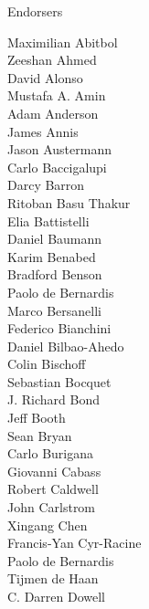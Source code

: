 \documentclass[PICOAPC.tex]{subfiles}
\begin{document}
\vskip -7pt

\large { \centerline {Endorsers}}
%
\footnotesize {
\begin{multicols}{4}
Maximilian Abitbol              \\
Zeeshan Ahmed                   \\
David Alonso                    \\
Mustafa A. Amin                 \\
Adam Anderson                   \\
James Annis                     \\
Jason Austermann                \\
Carlo Baccigalupi               \\
Darcy Barron                    \\
Ritoban Basu Thakur             \\
Elia Battistelli                \\
Daniel Baumann                  \\
Karim Benabed                   \\
Bradford Benson                 \\
Paolo de Bernardis              \\
Marco Bersanelli                \\
Federico Bianchini              \\
Daniel Bilbao-Ahedo             \\
Colin Bischoff                  \\
Sebastian Bocquet               \\
J. Richard Bond                 \\
Jeff Booth                      \\
Sean Bryan                      \\
Carlo Burigana                  \\
Giovanni Cabass                 \\
Robert Caldwell                 \\
John Carlstrom                  \\
Xingang Chen                    \\
Francis-Yan Cyr-Racine          \\
Paolo de Bernardis              \\
Tijmen de Haan                  \\
C. Darren Dowell                \\

\end{multicols}}
\end{document}
